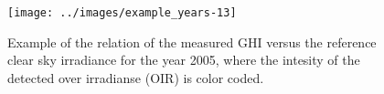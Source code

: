 \documentclass[preprint, 3p,
authoryear]{elsarticle} %
\begin{document}
\begin{figure}

{\centering \texttt{[image: ../images/example\_years-13]} 

}

\caption{Example of the relation of the measured GHI versus the reference clear sky irradiance for the year 2005, where the intesity of the detected over irradianse (OIR) is color coded.}\label{fig:example-year}
\end{figure}


\end{document}
